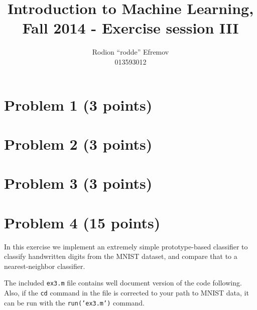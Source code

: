 \documentclass[10pt]{article}
\title{Introduction to Machine Learning, Fall 2014 - Exercise session III}
\author{Rodion ``rodde'' Efremov \\ 013593012}
\begin{document}
 \maketitle

\color{blue}
\section*{Problem 1 (3 points)}

\color{blue}
\section*{Problem 2 (3 points)}

\color{blue}
\section*{Problem 3 (3 points)}

\color{blue}
\section*{Problem 4 (15 points)}
In this exercise we implement an extremely simple prototype-based classifier to classify handwritten digits from the MNIST dataset, and compare that to a nearest-neighbor classifier.

\color{black}
The included \texttt{ex3.m} file contains well document version of the code following. Also, if the \texttt{cd} command in the file is corrected to your path to MNIST data, it can be run with the \texttt{run('ex3.m')} command.

\color{blue}
\end{document}
